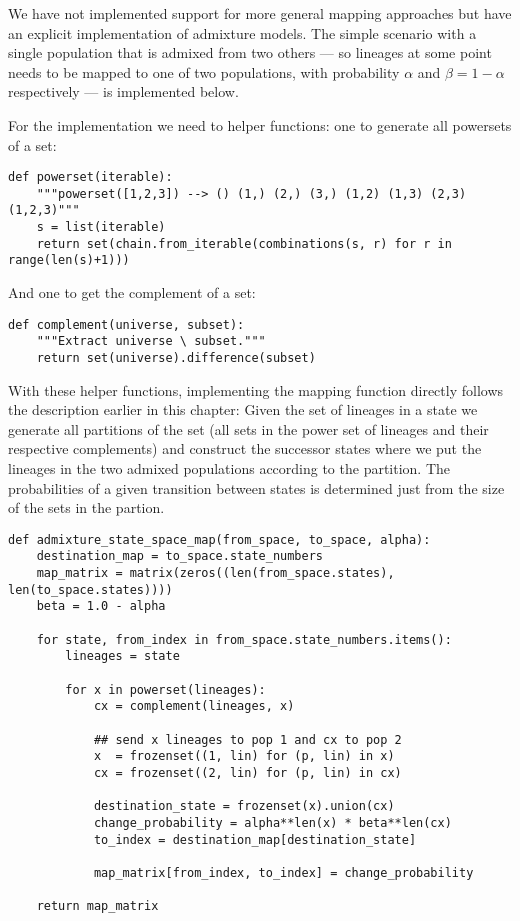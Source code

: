 We have not implemented support for more general mapping approaches but have an explicit implementation of admixture models. The simple scenario with a single population that is admixed from two others --- so lineages at some point needs to be mapped to one of two populations, with probability $\alpha$ and $\beta=1-\alpha$ respectively --- is implemented below.

For the implementation we need to helper functions: one to generate all powersets of a set:

\begin{lstlisting}
def powerset(iterable):
    """powerset([1,2,3]) --> () (1,) (2,) (3,) (1,2) (1,3) (2,3) (1,2,3)"""
    s = list(iterable)
    return set(chain.from_iterable(combinations(s, r) for r in range(len(s)+1)))
\end{lstlisting}

And one to get the complement of a set:
\begin{lstlisting}
def complement(universe, subset):
    """Extract universe \ subset."""
    return set(universe).difference(subset)
\end{lstlisting}

With these helper functions, implementing the mapping function directly follows the description earlier in this chapter: Given the set of lineages in a state we generate all partitions of the set (all sets in the power set of lineages and their respective complements) and construct the successor states where we put the lineages in the two admixed populations according to the partition. The probabilities of a given transition between states is determined just from the size of the sets in the partion.

\begin{lstlisting}
def admixture_state_space_map(from_space, to_space, alpha):
    destination_map = to_space.state_numbers
    map_matrix = matrix(zeros((len(from_space.states), len(to_space.states))))
    beta = 1.0 - alpha

    for state, from_index in from_space.state_numbers.items():
        lineages = state

        for x in powerset(lineages):
            cx = complement(lineages, x)

            ## send x lineages to pop 1 and cx to pop 2
            x  = frozenset((1, lin) for (p, lin) in x)
            cx = frozenset((2, lin) for (p, lin) in cx)

            destination_state = frozenset(x).union(cx)
            change_probability = alpha**len(x) * beta**len(cx)
            to_index = destination_map[destination_state]

            map_matrix[from_index, to_index] = change_probability

    return map_matrix
\end{lstlisting}


